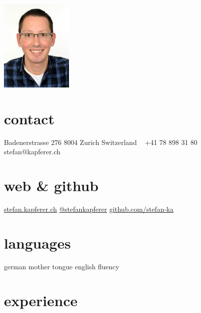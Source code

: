 \documentclass[]{cv-style}
\begin{document}


\begin{aside}
\includegraphics[width=3.5cm]{ska}
%
\section{contact}
Badenerstrasse 276
8004 Zurich
Switzerland
~
+41 78 898 31 80
~
stefan@kapferer.ch
%
\section{web \& github}
\href{https://stefan.kapferer.ch}{stefan.kapferer.ch}
\href{https://twitter.com/stefankapferer}{@stefankapferer}
\href{https://github.com/stefan-ka}{github.com/stefan-ka}
%
\section{languages}
german mother tongue
english fluency
%
\end{aside}


\section{experience}
\end{document}
